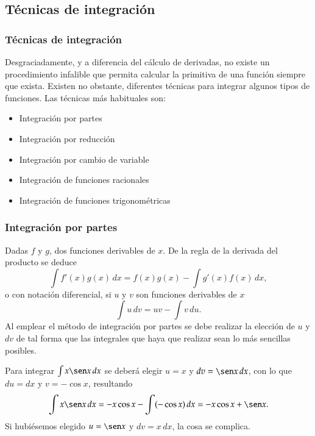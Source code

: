 \subsection{Técnicas de integración}
\begin{frame}
\frametitle{Técnicas de integración}
Desgraciadamente, y a diferencia del cálculo de derivadas, no existe un procedimiento infalible que permita calcular la primitiva de una función siempre que exista. Existen no obstante, diferentes técnicas para integrar algunos tipos de funciones. Las técnicas más habituales son:
\begin{itemize}
\item Integración por partes
\item Integración por reducción
\item Integración por cambio de variable
\item Integración de funciones racionales
\item Integración de funciones trigonométricas
\end{itemize}
\end{frame}


\begin{frame}
\frametitle{Integración por partes}
Dadas $f$ y $g$, dos funciones derivables de $x$. De la regla de la derivada del producto se deduce
\[
\int{f'(x)g(x)}\,dx=f(x)g(x)-\int{g'(x)f(x)}\,dx,
\]
o con notación diferencial, si $u$ y $v$ son funciones derivables de $x$
\[
\int{u}\,dv=uv-\int{v}\,du.
\]
Al emplear el método de integración por partes se debe realizar la elección de $u$ y $dv$ de tal forma que las integrales que haya que realizar sean lo más sencillas posibles.

 Para integrar $\int{x \sen x}\,dx$ se deberá elegir $u=x$ y $dv=\sen x\, dx$, con lo que $du=dx$ y $v=-\cos x$, resultando
\[
\int{x \sen x}\,dx=-x\cos x-\int (-\cos x)\,dx = -x\cos x +\sen x.
\]
Si hubiésemos elegido $u=\sen x$ y $dv=x\,dx$, la cosa se complica.
\end{frame}



